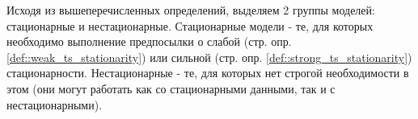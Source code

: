 		Исходя из вышеперечисленных определений, выделяем 2 группы моделей: стационарные и нестационарные. Стационарные модели - те, для которых необходимо выполнение предпосылки о слабой (стр. \pageref{def::weak_ts_stationarity} опр. \ref{def::weak_ts_stationarity}) или сильной (стр. \pageref{def::strong_ts_stationarity} опр. \ref{def::strong_ts_stationarity}) стационарности. Нестационарные - те, для которых нет строгой необходимости в этом (они могут работать как со стационарными данными, так и с нестационарными).		
		
		
		
		
		
		
		
		
		
		
		